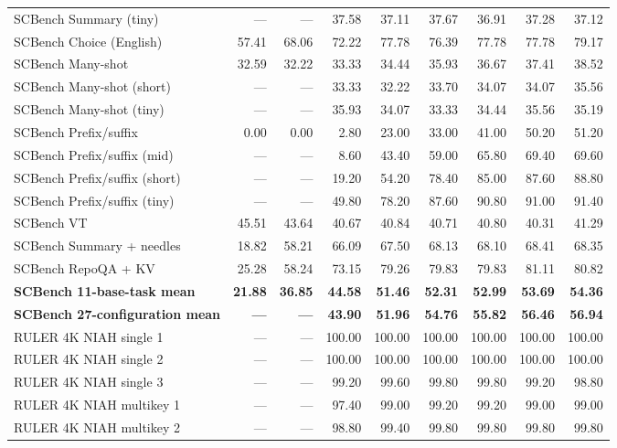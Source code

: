 \begin{longtable}{@{}lrrrrrrrr@{}}
SCBench Summary (tiny) & --- & --- & 37.58 & 37.11 & 37.67 & 36.91 & 37.28 & 37.12 \\
SCBench Choice (English) & 57.41 & 68.06 & 72.22 & 77.78 & 76.39 & 77.78 & 77.78 & 79.17 \\
SCBench Many-shot & 32.59 & 32.22 & 33.33 & 34.44 & 35.93 & 36.67 & 37.41 & 38.52 \\
SCBench Many-shot (short) & --- & --- & 33.33 & 32.22 & 33.70 & 34.07 & 34.07 & 35.56 \\
SCBench Many-shot (tiny) & --- & --- & 35.93 & 34.07 & 33.33 & 34.44 & 35.56 & 35.19 \\
SCBench Prefix/suffix & 0.00 & 0.00 & 2.80 & 23.00 & 33.00 & 41.00 & 50.20 & 51.20 \\
SCBench Prefix/suffix (mid) & --- & --- & 8.60 & 43.40 & 59.00 & 65.80 & 69.40 & 69.60 \\
SCBench Prefix/suffix (short) & --- & --- & 19.20 & 54.20 & 78.40 & 85.00 & 87.60 & 88.80 \\
SCBench Prefix/suffix (tiny) & --- & --- & 49.80 & 78.20 & 87.60 & 90.80 & 91.00 & 91.40 \\
SCBench VT & 45.51 & 43.64 & 40.67 & 40.84 & 40.71 & 40.80 & 40.31 & 41.29 \\
SCBench Summary + needles & 18.82 & 58.21 & 66.09 & 67.50 & 68.13 & 68.10 & 68.41 & 68.35 \\
SCBench RepoQA + KV & 25.28 & 58.24 & 73.15 & 79.26 & 79.83 & 79.83 & 81.11 & 80.82 \\
\hline
\textbf{SCBench 11-base-task mean} & \textbf{21.88} & \textbf{36.85} & \textbf{44.58} & \textbf{51.46} & \textbf{52.31} & \textbf{52.99} & \textbf{53.69} & \textbf{54.36} \\
\hline
\hline
\textbf{SCBench 27-configuration mean} & \textbf{---} & \textbf{---} & \textbf{43.90} & \textbf{51.96} & \textbf{54.76} & \textbf{55.82} & \textbf{56.46} & \textbf{56.94} \\
\hline
\pagebreak[4]
RULER 4K NIAH single 1 & --- & --- & 100.00 & 100.00 & 100.00 & 100.00 & 100.00 & 100.00 \\
RULER 4K NIAH single 2 & --- & --- & 100.00 & 100.00 & 100.00 & 100.00 & 100.00 & 100.00 \\
RULER 4K NIAH single 3 & --- & --- & 99.20 & 99.60 & 99.80 & 99.80 & 99.20 & 98.80 \\
RULER 4K NIAH multikey 1 & --- & --- & 97.40 & 99.00 & 99.20 & 99.20 & 99.00 & 99.00 \\
RULER 4K NIAH multikey 2 & --- & --- & 98.80 & 99.40 & 99.80 & 99.80 & 99.80 & 99.80 \\

\end{longtable}
